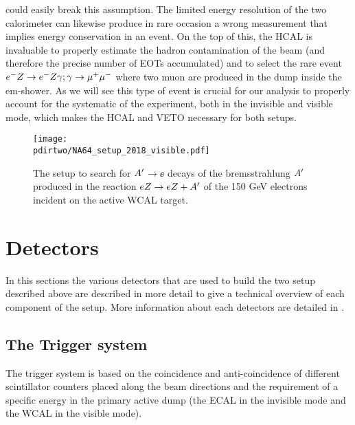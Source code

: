 could easily break this assumption. The limited energy resolution of the two calorimeter can likewise produce in rare occasion a wrong measurement that implies energy conservation in an event. On the top of this, the HCAL is invaluable to properly estimate the hadron contamination of the beam (and therefore the precise number of EOTs accumulated) and to select the rare event $e^- Z \to e^- Z \gamma; \gamma \to \mu^+ \mu^-$ where two muon are produced in the dump inside the em-shower. As we will see this type of event is crucial for our analysis to properly account for the systematic of the experiment, both in the invisible and visible mode, which makes the HCAL and VETO necessary for both setups.

\iffalse
The method of the search for $\aee$ (or $\xdecay$) decays is detailed in . Here, we review it briefly. The $\DM$ is produced via scattering of 150 GeV electrons off nuclei of an active target-dump. The $\DM$ production is followed by its decay into $\ee$ pairs:
detailed in \cite{Gninenko:2013rka, Andreas:2013lya, gkkk1, DMsimulation}, 
\begin{equation}
e^- + Z \to e^- + Z + \DM   ;~ \DM\to \ee \,.
\label{ea}
\end{equation}
\fi

\begin{figure}[tb]
\centering
\texttt{[image: \\pdirtwo/NA64\_setup\_2018\_visible.pdf]}
\caption[NA64 visible mode setup 2018]{The setup to search for $\DM$$\to \ee$  decays of the bremsstrahlung $\DM$ produced in the reaction
$eZ \to eZ+A' $ of the 150 GeV electrons incident on the active WCAL target.}
\label{fig:setup-vis-2018}
\end{figure}

\section{Detectors}
\label{ch2:sec:detectors}

In this sections the various detectors that are used to build the two setup described above are described in more detail to give a technical overview of each component of the setup. More information about each detectors are detailed in \cite{na64-hcal,na64-detectors,ABBON201569}. 

\subsection{The Trigger system}
\label{ch2:sec:detectors-trigger}

The trigger system is based on the coincidence and anti-coincidence of different scintillator counters placed along the beam directions and the requirement of a specific energy in the primary active dump (the ECAL in the invisible mode and the WCAL in the visible mode).

